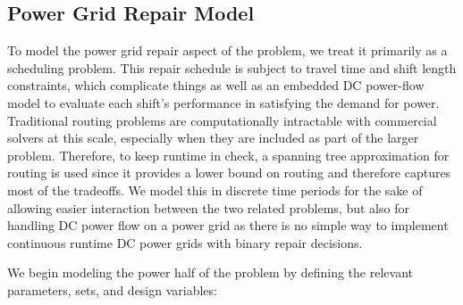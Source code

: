 \documentclass[10pt]{article}
\begin{document}
\subsection{Power Grid Repair Model}
\vspace*{-12pt}
To model the power grid repair aspect of the problem, we treat it primarily as a scheduling problem. This repair schedule is subject to travel time and shift length constraints, which complicate things as well as an embedded DC power-flow model to evaluate each shift's performance in satisfying the demand for power. Traditional routing problems are computationally intractable with commercial solvers at this scale, especially when they are included as part of the larger problem. Therefore, to keep runtime in check, a spanning tree approximation for routing is used since it provides a lower bound on routing and therefore captures most of the tradeoffs. We model this in discrete time periods for the sake of allowing easier interaction between the two related problems, but also for handling DC power flow on a power grid as there is no simple way to implement continuous runtime DC power grids with binary repair decisions.

We begin modeling the power half of the problem by defining the relevant parameters, sets, and design variables:
\end{document}
